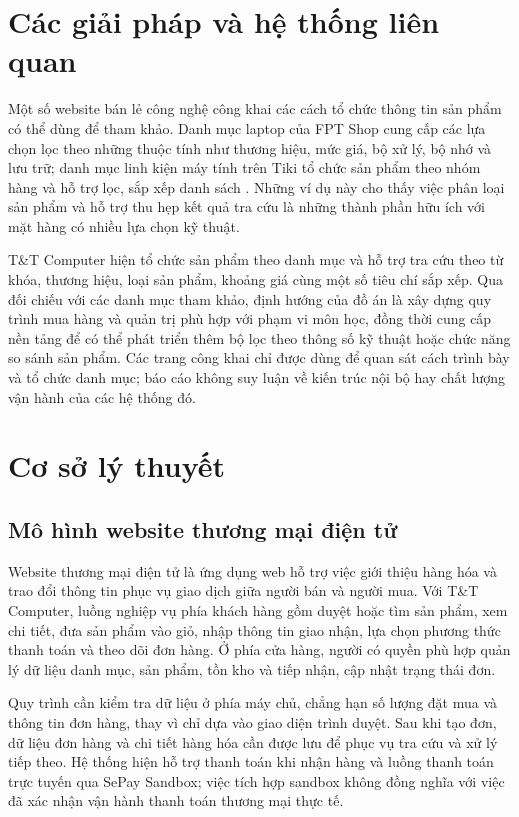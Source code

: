\section{Các giải pháp và hệ thống liên quan}
Một số website bán lẻ công nghệ công khai các cách tổ chức thông tin sản phẩm có thể dùng để tham khảo. Danh mục laptop của FPT Shop cung cấp các lựa chọn lọc theo những thuộc tính như thương hiệu, mức giá, bộ xử lý, bộ nhớ và lưu trữ; danh mục linh kiện máy tính trên Tiki tổ chức sản phẩm theo nhóm hàng và hỗ trợ lọc, sắp xếp danh sách \cite{fptshop-laptop,tiki-components}. Những ví dụ này cho thấy việc phân loại sản phẩm và hỗ trợ thu hẹp kết quả tra cứu là những thành phần hữu ích với mặt hàng có nhiều lựa chọn kỹ thuật.

T\&T Computer hiện tổ chức sản phẩm theo danh mục và hỗ trợ tra cứu theo từ khóa, thương hiệu, loại sản phẩm, khoảng giá cùng một số tiêu chí sắp xếp. Qua đối chiếu với các danh mục tham khảo, định hướng của đồ án là xây dựng quy trình mua hàng và quản trị phù hợp với phạm vi môn học, đồng thời cung cấp nền tảng để có thể phát triển thêm bộ lọc theo thông số kỹ thuật hoặc chức năng so sánh sản phẩm. Các trang công khai chỉ được dùng để quan sát cách trình bày và tổ chức danh mục; báo cáo không suy luận về kiến trúc nội bộ hay chất lượng vận hành của các hệ thống đó.

\section{Cơ sở lý thuyết}
\subsection{Mô hình website thương mại điện tử}
Website thương mại điện tử là ứng dụng web hỗ trợ việc giới thiệu hàng hóa và trao đổi thông tin phục vụ giao dịch giữa người bán và người mua. Với T\&T Computer, luồng nghiệp vụ phía khách hàng gồm duyệt hoặc tìm sản phẩm, xem chi tiết, đưa sản phẩm vào giỏ, nhập thông tin giao nhận, lựa chọn phương thức thanh toán và theo dõi đơn hàng. Ở phía cửa hàng, người có quyền phù hợp quản lý dữ liệu danh mục, sản phẩm, tồn kho và tiếp nhận, cập nhật trạng thái đơn.

Quy trình cần kiểm tra dữ liệu ở phía máy chủ, chẳng hạn số lượng đặt mua và thông tin đơn hàng, thay vì chỉ dựa vào giao diện trình duyệt. Sau khi tạo đơn, dữ liệu đơn hàng và chi tiết hàng hóa cần được lưu để phục vụ tra cứu và xử lý tiếp theo. Hệ thống hiện hỗ trợ thanh toán khi nhận hàng và luồng thanh toán trực tuyến qua SePay Sandbox; việc tích hợp sandbox không đồng nghĩa với việc đã xác nhận vận hành thanh toán thương mại thực tế.

